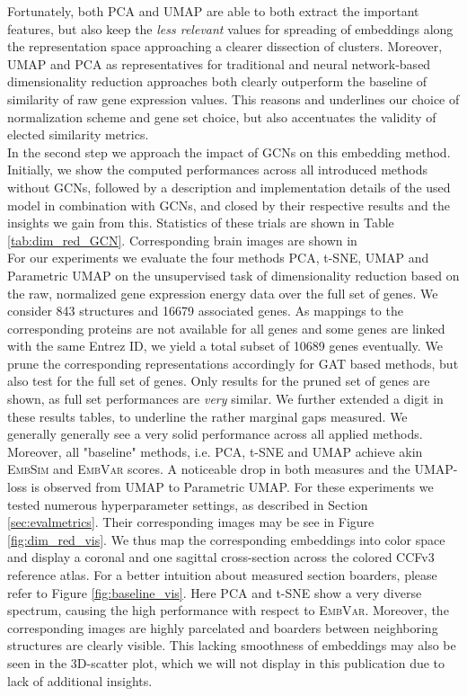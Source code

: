 \documentclass[]{article}
\begin{document}
Fortunately, both PCA and UMAP are able to both extract the important features, but also keep the \textit{less relevant} values for spreading of embeddings along the representation space approaching a clearer dissection of clusters. Moreover, UMAP and PCA as representatives for traditional and neural network-based dimensionality reduction approaches both clearly outperform the baseline of similarity of raw gene expression values. 
This reasons and underlines our choice of normalization scheme and gene set choice, but also accentuates the validity of elected similarity metrics.\\

In the second step we approach the impact of GCNs on this embedding method. Initially, we show the computed performances across all introduced methods without GCNs, followed by a description and implementation details of the used model in combination with GCNs, and closed by their respective results and the insights we gain from this. Statistics of these trials are shown in Table \ref{tab:dim_red_GCN}. Corresponding brain images are shown in \\

For our experiments we evaluate the four methods PCA, t-SNE, UMAP and Parametric UMAP on the unsupervised task of dimensionality reduction based on the raw, normalized gene expression energy data over the full set of genes. We consider 843 structures and 16679 associated genes. As mappings to the corresponding proteins are not available for all genes and some genes are linked with the same Entrez ID, we yield a total subset of 10689 genes eventually. We prune the corresponding representations accordingly for GAT based methods, but also test for the full set of genes. Only results for the pruned set of genes are shown, as full set performances are \textit{very} similar. We further extended a digit in these results tables, to underline the rather marginal gaps measured.
We generally generally see a very solid performance across all applied methods. Moreover, all "baseline" methods, i.e. PCA, t-SNE and UMAP achieve akin \textsc{EmbSim} and \textsc{EmbVar} scores. A noticeable drop in both measures and the UMAP-loss is observed from UMAP to Parametric UMAP. For these experiments we tested numerous hyperparameter settings, as described in Section \ref{sec:evalmetrics}. Their corresponding images may be see in Figure \ref{fig:dim_red_vis}. We thus map the corresponding embeddings into color space and display a coronal and one sagittal cross-section across the colored CCFv3 reference atlas. For a better intuition about measured section boarders, please refer to Figure \ref{fig:baseline_vis}. 
Here PCA and t-SNE show a very diverse spectrum, causing the high performance with respect to \textsc{EmbVar}. Moreover, the corresponding images are highly parcelated and boarders between neighboring structures are clearly visible. This lacking smoothness of embeddings may also be seen in the 3D-scatter plot, which we will not display in this publication due to lack of additional insights. \\
\end{document}
